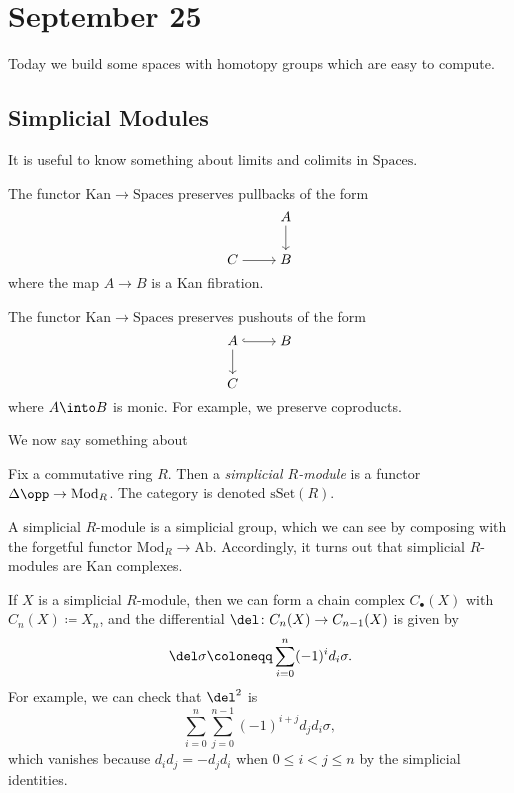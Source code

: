 \documentclass[../notes.tex]{subfiles}
\begin{document}
\section{September 25}
Today we build some spaces with homotopy groups which are easy to compute.

\subsection{Simplicial Modules}
It is useful to know something about limits and colimits in $\mathrm{Spaces}$.
\begin{remark}
	The functor $\mathrm{Kan}\to\mathrm{Spaces}$ preserves pullbacks of the form
	\[\begin{tikzcd}[cramped]
		& A \\
		C & B
		\arrow[from=1-2, to=2-2]
		\arrow[from=2-1, to=2-2]
	\end{tikzcd}\]
	where the map $A\to B$ is a Kan fibration.
\end{remark}
\begin{remark}
	The functor $\mathrm{Kan}\to\mathrm{Spaces}$ preserves pushouts of the form
	\[\begin{tikzcd}[cramped]
		A & B \\
		C
		\arrow[hook, from=1-1, to=1-2]
		\arrow[from=1-1, to=2-1]
	\end{tikzcd}\]
	where $A\into B$ is monic. For example, we preserve coproducts.
\end{remark}
We now say something about 
\begin{definition}
	Fix a commutative ring $R$. Then a \textit{simplicial $R$-module} is a functor $\Delta\opp\to\mathrm{Mod}_R$. The category is denoted $\mathrm{sSet}(R)$.
\end{definition}
\begin{remark}
	A simplicial $R$-module is a simplicial group, which we can see by composing with the forgetful functor $\mathrm{Mod}_R\to\mathrm{Ab}$. Accordingly, it turns out that simplicial $R$-modules are Kan complexes.
\end{remark}
\begin{remark}
	If $X$ is a simplicial $R$-module, then we can form a chain complex $C_\bullet(X)$ with $C_n(X)\coloneqq X_n$, and the differential $\del\colon C_n(X)\to C_{n-1}(X)$ is given by
	\[\del\sigma\coloneqq\sum_{i=0}^n(-1)^id_i\sigma.\]
	For example, we can check that $\del^2$ is
	\[\sum_{i=0}^n\sum_{j=0}^{n-1}(-1)^{i+j}d_jd_i\sigma,\]
	which vanishes because $d_id_j=-d_jd_i$ when $0\le i<j\le n$ by the simplicial identities.
\end{remark}
\end{document}
